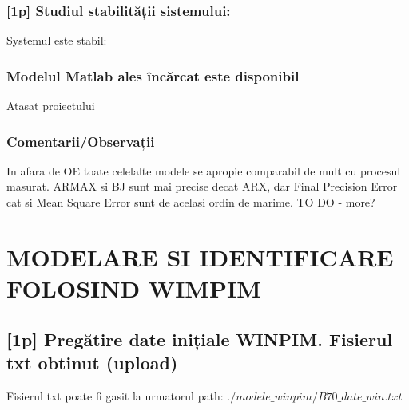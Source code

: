 \documentclass[12pt,english]{article}
\begin{document}
\subsubsection {[1p] Studiul stabilității sistemului: }
Systemul este stabil:
\begin{center}
\end{center}
\subsubsection {Modelul Matlab ales încărcat este disponibil}
Atasat proiectului
\subsubsection {Comentarii/Observații }
In afara de OE toate celelalte modele se apropie comparabil de mult cu procesul masurat. ARMAX si BJ sunt mai precise decat ARX, dar Final Precision Error cat si Mean Square Error sunt de acelasi ordin de marime.
TO DO - more?

\section {MODELARE SI IDENTIFICARE FOLOSIND WIMPIM }
\subsection {[1p] Pregătire date inițiale WINPIM. Fisierul txt obtinut (upload) }
Fisierul txt poate fi gasit la urmatorul path: $./modele\_winpim/B70\_date\_win.txt$
\end{document}
